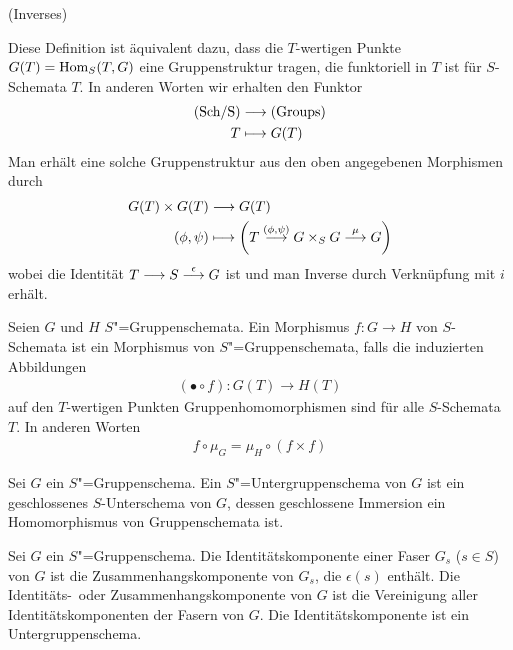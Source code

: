 \documentclass[german]{scrreprt}
\begin{document}
\begin{Definition}[$S$"=Gruppenschema]
\begin{enumerate}[label=(\alph*)]
    \hfill(Inverses)
  \end{enumerate}
  \begin{Bemerkung}
    Diese Definition ist äquivalent dazu, dass die $T$-wertigen Punkte
    $G(T)=\operatorname{Hom}_S(T,G)$ eine Gruppenstruktur tragen, die funktoriell in
    $T$ ist für $S$-Schemata $T$.
    In anderen Worten wir erhalten den Funktor 
    \begin{align*}
      \text{(Sch/S)} &\longrightarrow \text{(Groups)}\\
      T &\longmapsto G(T)
    \end{align*}
    Man erhält eine solche Gruppenstruktur aus den oben angegebenen
    Morphismen durch
    \begin{align*}
      G(T)\times G(T) &\longrightarrow G(T)\\
      (\phi, \psi) &\longmapsto 
                     \left(
                     T\overset{(\phi,\psi)}{\longrightarrow} G\times_S G
                     \overset\mu{\longrightarrow} G
                     \right)
    \end{align*}
    wobei die Identität $T\longrightarrow S\overset{\epsilon}{\longrightarrow} G$ ist und
    man Inverse durch Verknüpfung mit $i$ erhält.
  \end{Bemerkung}

  \begin{Definition}
    Seien $G$ und $H$ $S$"=Gruppenschemata.
    Ein Morphismus $f\colon G\to H$ von $S$-Schemata ist ein Morphismus
    von $S$"=Gruppenschemata, falls die induzierten Abbildungen
    \begin{gather*}
      (\bullet\circ f)\colon G(T)\to H(T)
    \end{gather*}auf den $T$-wertigen Punkten
    Gruppenhomomorphismen sind für alle $S$-Schemata $T$.
    In anderen Worten
    \begin{gather*}
      f\circ\mu_G = \mu_H\circ(f\times f)
    \end{gather*}
  \end{Definition}

  \begin{Definition}[Untergruppenschema]
    Sei $G$ ein $S$"=Gruppenschema.
    Ein $S$"=Untergruppenschema von $G$ ist ein geschlossenes
    $S$-Unterschema von $G$, dessen geschlossene Immersion ein
    Homomorphismus von Gruppenschemata ist.
  \end{Definition}
  \begin{Definition}[Identitätskomponente]
    Sei $G$ ein $S$"=Gruppenschema.
    Die Identitätskomponente einer Faser $G_s$ ($s\in S$) von $G$ ist
    die Zusammenhangskomponente von $G_s$, die $\epsilon(s)$ enthält.
    Die Identitäts-~oder Zusammenhangskomponente von $G$ ist
    die Vereinigung aller Identitätskomponenten der Fasern von $G$.
    Die Identitätskomponente ist ein Untergruppenschema.
  \end{Definition}


\end{Definition}
\end{document}
